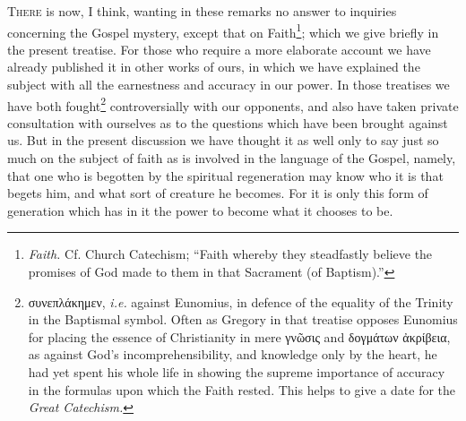 
\textsc{There} is now, I think, wanting in these remarks no answer to inquiries concerning the Gospel mystery, except that on Faith\footnote{\emph{Faith.} Cf. Church Catechism; “Faith whereby they steadfastly believe the promises of God made to them in that Sacrament (of Baptism).”}; which we give briefly in the present treatise. For those who require a more elaborate account we have already published it in other works of ours, in which we have explained the subject with all the earnestness and accuracy in our power. In those treatises we have both fought\footnote{\textgreek{συνεπλάκημεν}, \emph{i.e.} against Eunomius, in defence of the equality of the Trinity in the Baptismal symbol. Often as Gregory in that treatise opposes Eunomius for placing the essence of Christianity in mere \textgreek{γνῶσις} and \textgreek{δογμάτων ἀκρίβεια}, as against God’s incomprehensibility, and knowledge only by the heart, he had yet spent his whole life in showing the supreme importance of accuracy in the formulas upon which the Faith rested. This helps to give a date for the \emph{Great Catechism.}} controversially with our opponents, and also have taken private consultation with ourselves as to the questions which have been brought against us. But in the present discussion we have thought it as well only to say just so much on the subject of faith as is involved in the language of the Gospel, namely, that one who is begotten by the spiritual regeneration may know who it is that begets him, and what sort of creature he becomes. For it is only this form of generation which has in it the power to become what it chooses to be.


